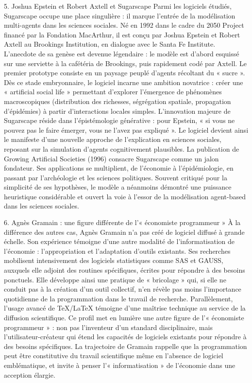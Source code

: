 5. Joshua Epstein et Robert Axtell et Sugarscape
Parmi les logiciels étudiés, Sugarscape occupe une place singulière : il marque l’entrée de la modélisation multi-agents dans les sciences sociales. Né en 1992 dans le cadre du 2050 Project financé par la Fondation MacArthur, il est conçu par Joshua Epstein et Robert Axtell au Brookings Institution, en dialogue avec le Santa Fe Institute.
L’anecdote de sa genèse est devenue légendaire : le modèle est d’abord esquissé sur une serviette à la cafétéria de Brookings, puis rapidement codé par Axtell. Le premier prototype consiste en un paysage peuplé d’agents récoltant du « sucre ». Dès ce stade embryonnaire, le logiciel incarne une ambition novatrice : créer une « artificial social life » permettant d’explorer l’émergence de phénomènes macroscopiques (distribution des richesses, ségrégation spatiale, propagation d’épidémies) à partir d’interactions locales simples.
L’innovation majeure de Sugarscape réside dans l’épistémologie générative : pour Epstein, « si vous ne pouvez pas le faire émerger, vous ne l’avez pas expliqué ». Le logiciel devient ainsi le manifeste d’une nouvelle approche de l’explication en sciences sociales, reposant sur la simulation d’agents cognitivement plausibles.
La publication de Growing Artificial Societies (1996) consacre Sugarscape comme un jalon fondateur. Ses applications se multiplient, de l’économie à l’épidémiologie, en passant par l’archéologie et les sciences politiques. Souvent critiqué pour la simplicité de ses hypothèses, le modèle a néanmoins démontré une puissance heuristique considérable et ouvert la voie à l’essor de la modélisation agent-based dans les sciences sociales.


6. Agnès Gramain : une figure différente de l’« économiste programmeur »
À la différence des autres cas, Agnès Gramain n’a pas créé de logiciel diffusé à grande échelle. Son expérience témoigne d’une autre modalité de l’informatisation de l’économie : l’appropriation et l’adaptation d’outils existants.
Ses recherches mobilisent intensivement des logiciels statistiques comme SAS et GAUSS, auxquels elle adjoint des routines spécifiques, écrites pour répondre à des besoins ponctuels. Elle développe ainsi une pratique de « bricolage » qui, si elle ne conduit pas à la création d’un outil collectif, n’en révèle pas moins l’importance quotidienne de la programmation dans le travail de recherche. Parallèlement, l’usage avancé de TeX/LaTeX témoigne d’une maîtrise technique au service de la diffusion scientifique.
Ce profil met en lumière une autre figure de l’« économiste programmeur » : non pas l’inventeur d’un standard disciplinaire, mais l’utilisateur-créateur qui étend les capacités de logiciels existants pour répondre à des besoins spécifiques. La trajectoire de Gramain rappelle que la programmation peut être constitutive du travail scientifique même en l’absence de logiciel emblématique, et invite à penser l’« informatisation » de l’économie dans une acception élargie.


